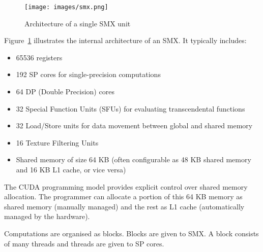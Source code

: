 \documentclass[12pt]{book}
\begin{document}
\begin{figure}[H]
    \centering
    \texttt{[image: images/smx.png]}
    \caption{Architecture of a single SMX unit}
    \label{fig:smx}
\end{figure}

Figure~\ref{fig:smx} illustrates the internal architecture of an SMX. It typically includes:
\begin{itemize}
    \item 65536 registers
    \item 192 SP cores for single-precision computations
    \item 64 DP (Double Precision) cores
    \item 32 Special Function Units (SFUs) for evaluating transcendental functions
    \item 32 Load/Store units for data movement between global and shared memory
    \item 16 Texture Filtering Units
    \item Shared memory of size 64 KB (often configurable as 48 KB shared memory and 16 KB L1 cache, or vice versa)
\end{itemize}

The CUDA programming model provides explicit control over shared memory allocation. The programmer can allocate a portion of this 64 KB memory as shared memory (manually managed) and the rest as L1 cache (automatically managed by the hardware).

Computations are organised as blocks. Blocks are given to SMX. A block consists of many threads and threads are given to SP cores.
\end{document}
